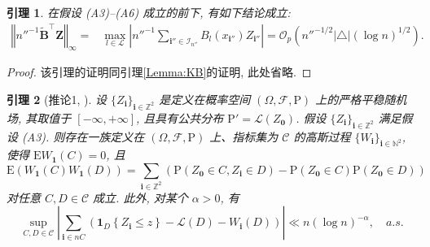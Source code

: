 \documentclass[a4paper,openay,14pt]{ctexbook}
\newtheorem{lem}{引理}
\numberwithin{equation}{section}
\numberwithin{lem}{section}
\begin{document}
\begin{lem}\label{Lemma:BZ}
    在假设 (A3)--(A6) 成立的前下, 有如下结论成立:
    \begin{align*}
       \left\Vert n''^{-1}\tilde{\mathbf{B}}^{\top}\mathbf{Z}\right\Vert_{\infty} =& \max_{l \in \mathcal{L}}\left\vert n''^{-1}\sum_{\mathbf{i}''\in\mathcal{I}_{n''}}B_l(x_{\mathbf{i}''})Z_{\mathbf{i}''}\right\vert
        =\mathcal{O}_p\left(n''^{-1/2}\vert\triangle\vert(\log n)^{1/2}\right).
    \end{align*}
\end{lem}
\begin{proof}
    该引理的证明同引理\ref{Lemma:KB}的证明, 此处省略.
\end{proof}

\begin{lem}[推论1, \cite{Strittmatter1990}] \label{Lemma:Gaussian}
设 $\{Z_{\mathbf{i}}\}_{\mathbf{i}\in\mathbb{Z}^2}$ 是定义在概率空间 $\left(\Omega,\mathcal{F},\mathrm{P}\right)$ 上的严格平稳随机场, 其取值于 $[-\infty,+\infty]$, 且具有公共分布 $\mathrm{P}'=\mathcal{L}\left(Z_{\mathbf{0}}\right)$. 假设 $\{Z_{\mathbf{i}}\}_{\mathbf{i}\in\mathbb{Z}^2}$ 满足假设 (A3). 则存在一族定义在 $\left(\Omega,\mathcal{F},\mathrm{P}\right)$ 上、指标集为 $\mathcal{C}$ 的高斯过程 $\{W_{\mathbf{i}}\}_{\mathbf{i}\in\mathbb{N}^2}$, 使得 $\text{E} W_{\mathbf{1}}(C) = 0$, 且  
$$\mathrm{E}\left(W_{\mathbf{1}}(C)W_{\mathbf{1}}(D)\right) = \sum_{\mathbf{i}\in\mathbb{Z}^2}\left(\mathrm{P}(Z_{\mathbf{0}}\in C,Z_{\mathbf{i}}\in D) - \mathrm{P}(Z_{\mathbf{0}}\in C)\mathrm{P}(Z_{\mathbf{0}}\in D)\right)$$ 
对任意 $C,D\in\mathcal{C}$ 成立. 此外, 对某个 $\alpha>0$, 有
$$\sup_{C,D\in\mathcal{C}}\left\vert \sum_{\mathbf{i}\in nC}\left(\mathbf{1}_D\left\{Z_{\mathbf{i}}\le z\right\} - \mathcal{L}(D) - W_{\mathbf{i}}(D)\right)\right\vert\ll n(\log n)^{-\alpha}, \quad a.s.$$
\end{lem}
\end{document}
